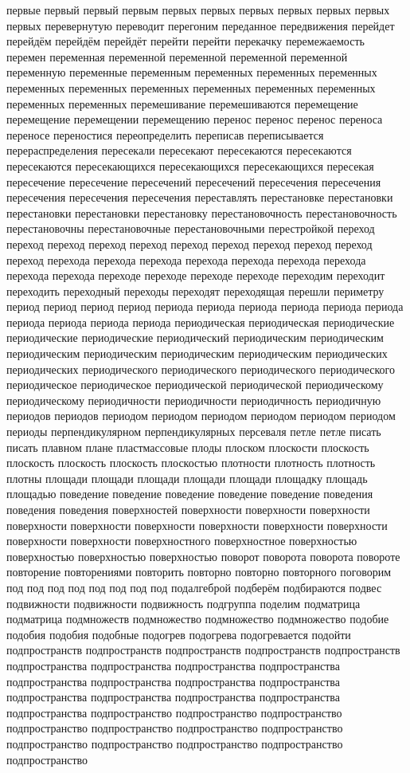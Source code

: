 первые первый первый первым первых первых первых первых первых первых первых перевернутую переводит перегоним переданное передвижения перейдет перейдём перейдём перейдёт перейти перейти перекачку перемежаемость перемен переменная переменной переменной переменной переменной переменную переменные переменным переменных переменных переменных переменных переменных переменных переменных переменных переменных переменных переменных перемешивание перемешиваются перемещение перемещение перемещении перемещению перенос перенос перенос переноса переносе переностися переопределить переписав переписывается перераспределения пересекали пересекают пересекаются пересекаются пересекаются пересекающихся пересекающихся пересекающихся пересекая пересечение пересечение пересечений пересечений пересечения пересечения пересечения пересечения пересечения переставлять перестановке перестановки перестановки перестановки перестановку перестановочность перестановочность перестановочны перестановочные перестановочными перестройкой переход переход переход переход переход переход переход переход переход переход переход перехода перехода перехода перехода перехода перехода перехода перехода перехода переходе переходе переходе переходе переходим переходит переходить переходный переходы переходят переходящая перешли периметру период период период период периода периода периода периода периода периода периода периода периода периода периодическая периодическая периодические периодические периодические периодический периодическим периодическим периодическим периодическим периодическим периодическим периодических периодических периодического периодического периодического периодического периодическое периодическое периодической периодической периодическому периодическому периодичности периодичности периодичность периодичную периодов периодов периодом периодом периодом периодом периодом периодом периоды перпендикулярном перпендикулярных персеваля петле петле писать писать плавном плане пластмассовые плоды плоском плоскости плоскость плоскость плоскость плоскость плоскостью плотности плотность плотность плотны площади площади площади площади площади площадку площадь площадью поведение поведение поведение поведение поведение поведения поведения поведения поверхностей поверхности поверхности поверхности поверхности поверхности поверхности поверхности поверхности поверхности поверхности поверхности поверхностного поверхностное поверхностью поверхностью поверхностью поверхностью поворот поворота поворота повороте повторение повторениями повторить повторно повторно повторного поговорим под под под под под под под под подалгеброй подберём подбираются подвес подвижности подвижности подвижность подгруппа поделим подматрица подматрица подмножеств подмножество подмножество подмножество подобие подобия подобия подобные подогрев подогрева подогревается подойти подпространств подпространств подпространств подпространств подпространств подпространства подпространства подпространства подпространства подпространства подпространства подпространства подпространства подпространства подпространства подпространства подпространства подпространства подпространство подпространство подпространство подпространство подпространство подпространство подпространство подпространство подпространство подпространство подпространство подпространство 